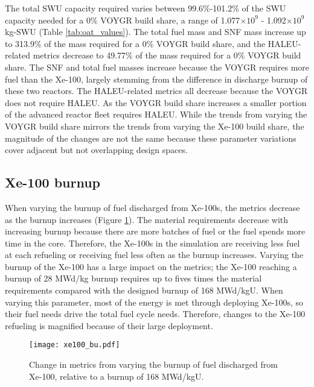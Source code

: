 The total \gls{SWU} capacity required varies between 99.6\%-101.2\% of the 
\gls{SWU} capacity needed for a 0\% VOYGR build share, a range of 1.077$\times 10^9$
- 1.092$\times 10^9$ kg-SWU (Table \ref{tab:oat_values}). The total fuel mass 
and \gls{SNF} mass increase 
up to 313.9\% of the mass required for a 0\% VOYGR build share, and the 
\gls{HALEU}-related metrics decrease to 49.77\% of the mass required 
for a 0\% VOYGR build share. The \gls{SNF} and total fuel masses increase 
because the VOYGR requires more fuel than the Xe-100, largely stemming from 
the difference in discharge burnup of these two reactors. The \gls{HALEU}-related 
metrics all decrease because the VOYGR does not require \gls{HALEU}. As the 
VOYGR build share increases a smaller portion of the advanced reactor fleet 
requires \gls{HALEU}. While the trends from varying the VOYGR build share 
mirrors the trends from varying the Xe-100 build share, the magnitude of the 
changes are not the same because these 
parameter variations cover adjacent but not overlapping design spaces. 

\subsection{Xe-100 burnup}
When varying the burnup of fuel discharged from Xe-100s, the metrics decrease 
as the burnup increases (Figure \ref{fig:xe100_bu_s7}). The material 
requirements decrease with increasing burnup because there are more 
batches of fuel or the fuel spends more time in the core.  
Therefore, the Xe-100s in the simulation are receiving 
less fuel at each refueling or receiving fuel less often as the burnup increases. 
Varying the burnup of the Xe-100 has a large impact on the metrics; the Xe-100 
reaching a burnup of 28 MWd/kg burnup requires up to fives times 
the material requirements compared with the designed burnup of 168 MWd/kgU.
When varying this parameter, most of the energy is met through deploying 
Xe-100s, so their fuel needs drive the total fuel cycle needs. 
Therefore, changes to the Xe-100 refueling is 
magnified because of their large deployment. 

\begin{figure}[h!]
    \centering
    \texttt{[image: xe100\_bu.pdf]}
    \caption{Change in metrics from varying the burnup of fuel 
    discharged from Xe-100, relative to a burnup of 168 MWd/kgU.}
    \label{fig:xe100_bu_s7}
\end{figure}

